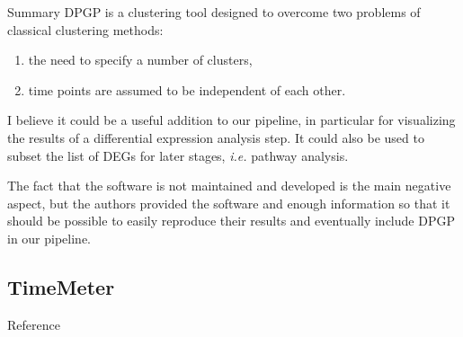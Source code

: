 \documentclass[10pt,a4paper]{article}
\newlength{\templength}
\newenvironment{ann_section}[1]
{\settowidth{\templength}{#1}%
\noindent\textbf{#1}
\hspace{1em}\begin{minipage}[t]{\dimexpr \linewidth-\the\templength-2em}}
{\end{minipage}\par\bigskip}
\begin{document}
\begin{ann_section}{Summary}
DPGP is a clustering tool designed to overcome two problems of classical clustering methods:
\begin{enumerate}
    \item the need to specify a number of clusters,
    \item time points are assumed to be independent of each other.
\end{enumerate}

I believe it could be a useful addition to our pipeline, in particular for visualizing the results of a differential expression analysis step. It could also be used to subset the list of DEGs for later stages, \textit{i.e.} pathway analysis.

The fact that the software is not maintained and developed is the main negative aspect, but the authors provided the software and enough information so that it should be possible to easily reproduce their results and eventually include DPGP in our pipeline.  
\end{ann_section}

\subsection{TimeMeter}
\begin{ann_section}{Reference}
\mbox{}
\end{ann_section}
\end{document}
